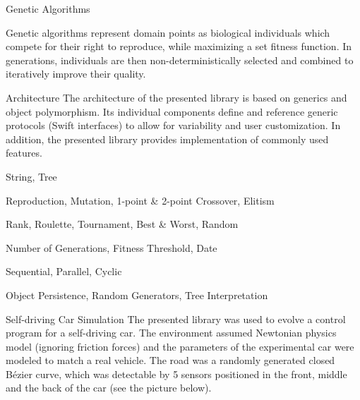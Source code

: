 \documentclass[a0paper,portrait]{baposter}
\newcommand{\compresslist}{
	\setlength{\itemsep}{1pt}
	\setlength{\parskip}{0pt}
	\setlength{\parsep}{0pt}
}
\begin{document}
\begin{poster}
\begin{posterbox}[name=intro-ga,column=0,below=objectives]{Genetic Algorithms}
	\vspace{-0.5em}

	Genetic algorithms represent domain points as biological individuals which compete for their right to reproduce, while maximizing a set fitness function. In generations, individuals are then non-deterministically selected and combined to iteratively improve their quality.
\end{posterbox}

\begin{posterbox}[name=arch,column=1]{Architecture}
	The architecture of the presented library is based on generics and object polymorphism. Its individual components define and reference generic protocols (Swift interfaces) to allow for variability and user customization. In addition, the presented library provides implementation of commonly used features.

	\vspace{-0.5em}

	\begin{description}
		\compresslist
		\item[Chromosomes (Genotypes):] String, Tree
		\item[Operators:] Reproduction, Mutation, 1-point \& 2-point Crossover, Elitism
		\item[Selection Methods:] Rank, Roulette, Tournament, Best \& Worst, Random
		\item[Termination Conditions:] Number of Generations, Fitness Threshold, Date
		\item[Evaluators:] Sequential, Parallel, Cyclic
		\item[Miscellaneous:] Object Persistence, Random Generators, Tree Interpretation
	\end{description}

\end{posterbox}

\begin{posterbox}[name=car,column=1,below=arch]{Self-driving Car Simulation}
	The presented library was used to evolve a control program for a self-driving car. The environment assumed Newtonian physics model (ignoring friction forces) and the parameters of the experimental car were modeled to match a real vehicle. The road was a randomly generated \cite{MelkmanConvexHull} \cite{CatmullRomSplines} closed Bézier curve, which was detectable by 5 sensors positioned in the front, middle and the back of the car (see the picture below).

	\vspace{0.5em}


\end{posterbox}
\end{poster}
\end{document}
